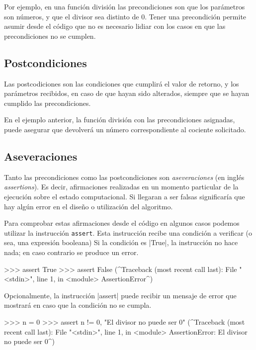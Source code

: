 Por ejemplo, en una función división las precondiciones son que los parámetros
son números, y que el divisor sea distinto de 0. Tener una precondición
permite asumir desde el código que no es necesario lidiar con los casos en que
las precondiciones no se cumplen.

\subsection{Postcondiciones}

Las postcodiciones son las condiciones que cumplirá el valor de retorno, y
los parámetros recibidos, en caso de que hayan sido alterados,
siempre que se hayan cumplido las precondiciones.

En el ejemplo anterior, la función división con las precondiciones asignadas,
puede asegurar que devolverá un número correspondiente al cociente solicitado.

\subsection{Aseveraciones}

Tanto las precondiciones como las postcondiciones son \textit{aseveraciones}
(en inglés \textit{assertions}). Es decir, afirmaciones realizadas en un momento
particular de la ejecución sobre el estado computacional. Si llegaran a ser
falsas significaría que hay algún error en el diseño o utilización del algoritmo.

Para comprobar estas afirmaciones desde el código en algunos casos podemos
utilizar la instrucción \lstinline!assert!. Esta instrucción recibe una
condición a verificar (o sea, una expresión booleana)
Si la condición es |True|, la instrucción no hace nada; en caso contrario se
produce un error.

\begin{codigo-python-sn}
>>> assert True
>>> assert False
(^Traceback (most recent call last):
  File "<stdin>", line 1, in <module>
AssertionError^)
\end{codigo-python-sn}

Opcionalmente, la instrucción |assert| puede recibir
un mensaje de error que mostrará en caso que la condición no se cumpla.

\begin{codigo-python-sn}
>>> n = 0
>>> assert n != 0, "El divisor no puede ser 0"
(^Traceback (most recent call last):
  File "<stdin>", line 1, in <module>
AssertionError: El divisor no puede ser 0^)
\end{codigo-python-sn}

